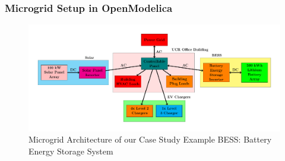 \documentclass[aspectratio=169, 8 pt]{beamer}
\begin{document}
	\begin{frame}
		\frametitle{Microgrid Setup in OpenModelica}
		\begin{figure}
			\centering
			\includegraphics[width=0.88\linewidth]{Fig/power_system_setup_modelica_large}
			\caption{Microgrid Architecture of our Case Study Example BESS: Battery Energy Storage System}
			\label{fig:powersystemsetupfull}
		\end{figure}
	\end{frame}
	
\end{document}
